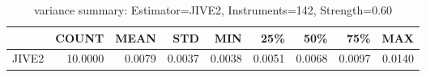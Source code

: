 \begin{table}[ht]
\centering
\caption{variance summary: Estimator=JIVE2, Instruments=142, Strength=0.60}
\begin{tabular}{lrrrrrrrr}
\toprule
 & COUNT & MEAN & STD & MIN & 25\% & 50\% & 75\% & MAX \\
\midrule
JIVE2 & 10.0000 & 0.0079 & 0.0037 & 0.0038 & 0.0051 & 0.0068 & 0.0097 & 0.0140 \\
\bottomrule
\end{tabular}
\end{table}
